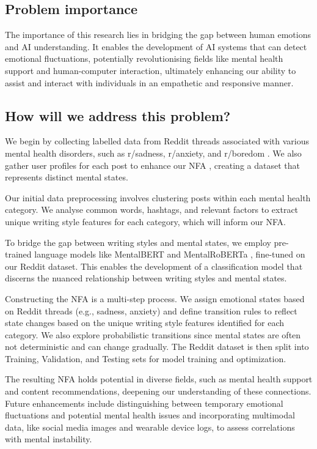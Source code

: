 \documentclass[conference,compsoc]{IEEEtran}
\begin{document}
\subsection{Problem importance}
The importance of this research lies in bridging the gap between human emotions and AI understanding. It enables the development of AI systems that can detect emotional fluctuations, potentially revolutionising fields like mental health support and human-computer interaction, ultimately enhancing our ability to assist and interact with individuals in an empathetic and responsive manner.

\subsection{How will we address this problem?}
We begin by collecting labelled data from Reddit threads associated with various mental health disorders, such as r/sadness, r/anxiety, and r/boredom \citep{Kim+20:DL-mental-illness}. We also gather user profiles for each post to enhance our NFA \citep{Pourkeyvan+23:mental-disorders-social-networks}, creating a dataset that represents distinct mental states.

Our initial data preprocessing involves clustering posts within each mental health category. We analyse common words, hashtags, and relevant factors to extract unique writing style features for each category, which will inform our NFA.

To bridge the gap between writing styles and mental states, we employ pre-trained language models like MentalBERT and MentalRoBERTa \citep{Ji+21:MentalBERT}, fine-tuned on our Reddit dataset. This enables the development of a classification model that discerns the nuanced relationship between writing styles and mental states.

Constructing the NFA is a multi-step process. We assign emotional states based on Reddit threads (e.g., sadness, anxiety) and define transition rules to reflect state changes based on the unique writing style features identified for each category. We also explore probabilistic transitions since mental states are often not deterministic and can change gradually. The Reddit dataset is then split into Training, Validation, and Testing sets for model training and optimization.

The resulting NFA holds potential in diverse fields, such as mental health support and content recommendations, deepening our understanding of these connections. Future enhancements include distinguishing between temporary emotional fluctuations and potential mental health issues and incorporating multimodal data, like social media images and wearable device logs, to assess correlations with mental instability.
\end{document}
